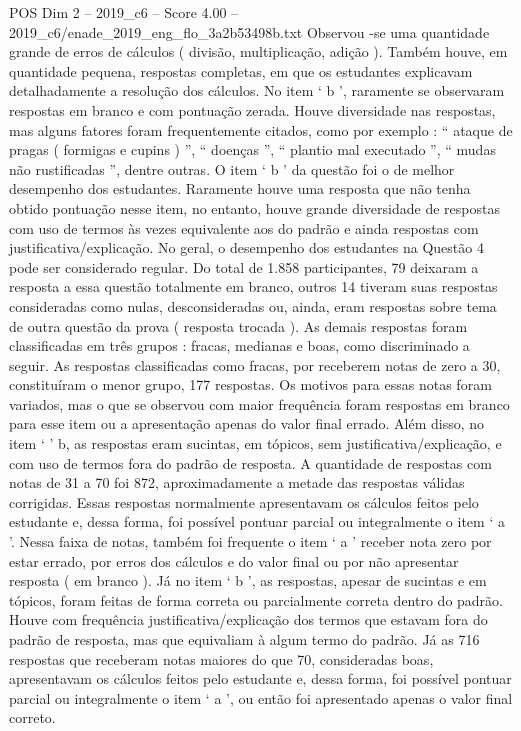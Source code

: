 \begin{textsample}{POS Dim 2 – 2019\_c6 – Score 4.00 – 2019\_c6/enade\_2019\_eng\_flo\_3a2b53498b.txt}
Observou -se uma quantidade grande de erros de cálculos ( divisão, multiplicação, adição ).
Também houve, em quantidade pequena, respostas completas, em que os estudantes explicavam detalhadamente a resolução dos cálculos.
No item ‘ b ’, raramente se observaram respostas em branco e com pontuação zerada.
Houve diversidade nas respostas, mas alguns fatores foram frequentemente citados, como por exemplo : “ ataque de pragas ( formigas e cupins ) ”, “ doenças ”, “ plantio mal executado ”, “ mudas não rustificadas ”, dentre outras.
O item ‘ b ’ da questão foi o de melhor desempenho dos estudantes.
Raramente houve uma resposta que não tenha obtido pontuação nesse item, no entanto, houve grande diversidade de respostas com uso de termos às vezes equivalente aos do padrão e ainda respostas com justificativa/explicação.
No geral, o desempenho dos estudantes na Questão 4 pode ser considerado regular.
Do total de 1.858 participantes, 79 deixaram a resposta a essa questão totalmente em branco, outros 14 tiveram suas respostas consideradas como nulas, desconsideradas ou, ainda, eram respostas sobre tema de outra questão da prova ( resposta trocada ).
As demais respostas foram classificadas em três grupos : fracas, medianas e boas, como discriminado a seguir.
As respostas classificadas como fracas, por receberem notas de zero a 30, constituíram o menor grupo, 177 respostas.
Os motivos para essas notas foram variados, mas o que se observou com maior frequência foram respostas em branco para esse item ou a apresentação apenas do valor final errado.
Além disso, no item ‘ ’ b, as respostas eram sucintas, em tópicos, sem justificativa/explicação, e com uso de termos fora do padrão de resposta.
A quantidade de respostas com notas de 31 a 70 foi 872, aproximadamente a metade das respostas válidas corrigidas.
Essas respostas normalmente apresentavam os cálculos feitos pelo estudante e, dessa forma, foi possível pontuar parcial ou integralmente o item ‘ a ’.
Nessa faixa de notas, também foi frequente o item ‘ a ’ receber nota zero por estar errado, por erros dos cálculos e do valor final ou por não apresentar resposta ( em branco ).
Já no item ‘ b ’, as respostas, apesar de sucintas e em tópicos, foram feitas de forma correta ou parcialmente correta dentro do padrão.
Houve com frequência justificativa/explicação dos termos que estavam fora do padrão de resposta, mas que equivaliam à algum termo do padrão.
Já as 716 respostas que receberam notas maiores do que 70, consideradas boas, apresentavam os cálculos feitos pelo estudante e, dessa forma, foi possível pontuar parcial ou integralmente o item ‘ a ’, ou então foi apresentado apenas o valor final correto.

\end{textsample}
